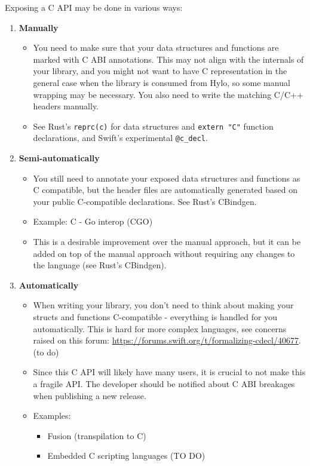Exposing a C API may be done in various ways:
\begin{enumerate}[label=(\alph*)]
\item \textbf{Manually}
  \begin{itemize}
  \item You need to make sure that your data structures and functions are marked with C ABI annotations. This may not align with the internals of your library, and you might not want to have C representation in the general case when the library is consumed from Hylo, so some manual wrapping may be necessary. You also need to write the matching C/C++ headers manually.
  \item See Rust's \texttt{reprc(c)} for data structures and \texttt{extern "C"} function declarations, and Swift's experimental \texttt{@c\_decl}.
  \end{itemize}
\item \textbf{Semi-automatically}
  \begin{itemize}
  \item You still need to annotate your exposed data structures and functions as C compatible, but the header files are automatically generated based on your public C-compatible declarations. See Rust's CBindgen.
  \item Example: C - Go interop (CGO)
  \item This is a desirable improvement over the manual approach, but it can be added on top of the manual approach without requiring any changes to the language (see Rust's CBindgen). %
  \end{itemize}
\item \textbf{Automatically}
  \begin{itemize}
  \item When writing your library, you don't need to think about making your structs and functions C-compatible - everything is handled for you automatically. This is hard for more complex languages, see concerns raised on this forum: \url{https://forums.swift.org/t/formalizing-cdecl/40677}. (to do)
  \item Since this C API will likely have many users, it is crucial to not make this a fragile API. The developer should be notified about C ABI breakages when publishing a new release.
  \item Examples:
    \begin{itemize}
    \item Fusion (transpilation to C)
    \item Embedded C scripting languages (TO DO)
    \end{itemize}
  \end{itemize}
\end{enumerate}


